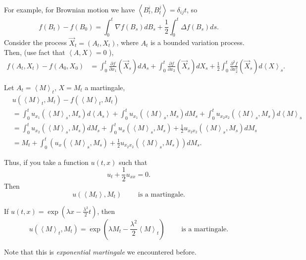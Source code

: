 For example, for Brownian motion we have $\left\langle B_t^i, B_t^j \right\rangle  = \delta_{i j}t$, so
\[
	f(B_t) - f(B_0) = \int _0^t \nabla f(B_s) d B_s + \frac{1}{2}\int _0^t \Delta f(B_s) d s
.\] 
Consider the process $\vec{X} _t = (A_t, X_t)$, where $A_t$ is a bounded variation process. Then, (use fact that $\left\langle A, X \right\rangle  = 0$ ),
\begin{align*}
	f(A_t, X_t) - f(A_0, X_0) 
	&= \int _0^t \frac{\partial f}{\partial x_1} (\vec{X} _s) d A_s 
	+ \int _0^t \frac{\partial f}{\partial x_2} (\vec{X} _s) d X_s
	+ \frac{1}{2} \int _0^t \frac{\partial ^2 f}{\partial x_2^2} (\vec{X} _s) d \left\langle X \right\rangle _s
.\end{align*} 

Let $A_t = \left\langle M \right\rangle _t$, $X = M_t$ a martingale,
\begin{align*}
	&u\left( \left\langle M \right\rangle _t, M_t \right)  - f\left( \left\langle M \right\rangle _t, M_t \right) \\
	&= \int _0^t u_{x_1}\left( \left\langle M \right\rangle _s, M_s \right)  d \left\langle A_s \right\rangle 
	+ \int _0^t u_{x_1} \left( \left\langle M \right\rangle _s, M_s \right)  d M_s
	+ \int _0^t u_{x_2 x_2} \left( \left\langle M \right\rangle _s, M_s \right)  d \left\langle M \right\rangle _s\\
	&=  \int _0^t u_{x_2}\left( \left\langle M \right\rangle _s, M_s \right)  d M_s 
	+ \int _0^t u_x\left( \left\langle M \right\rangle _s,  M_s \right)  + \frac{1}{2} u_{x_2 x_2} \left( \left\langle M \right\rangle _s, M_s \right)  d M_s\\
	&=  M_t + \int _0^t \left( u_x\left( \left\langle M \right\rangle _s, M_s \right) + \frac{1}{2} u_{x_2 x_2} \left( \left\langle M \right\rangle _s, M_s \right)  \right)  d M_s
.\end{align*} 

Thus, if you take a function $u(t, x)$ such that
\[
	u_t + \frac{1}{2} u_{x x} = 0
.\] 
Then
\[
	u\left( \left\langle M_t \right\rangle , M_t \right) \qquad \text{ is a martingale}
.\] 

\begin{corollary}
	If $u(t, x) = \exp\left( \lambda x - \frac{\lambda^2}{2} t \right) $, then
	\[
		u\left( \left\langle M \right\rangle _t, M_t \right) 
		= \exp\left( \lambda M_t - \frac{\lambda^2}{2}\left\langle M \right\rangle _t \right)  \qquad \text{ is a martingale}
	.\] 
\end{corollary}
Note that this is \textit{exponential martingale} we encountered before.

